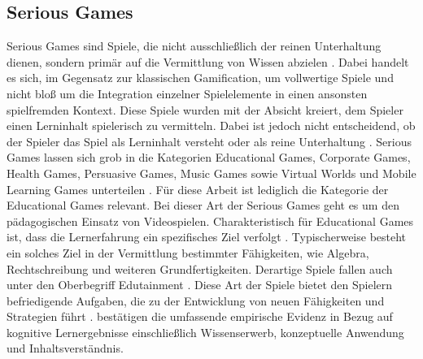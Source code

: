 \subsection{Serious Games}
Serious Games sind Spiele, die nicht ausschließlich der reinen Unterhaltung dienen, sondern primär auf die Vermittlung von Wissen abzielen \cite[S.17]{michael_serious_2005}. Dabei handelt es sich, im Gegensatz zur klassischen Gamification, um vollwertige Spiele und nicht bloß um die Integration einzelner Spielelemente in einen ansonsten spielfremden Kontext. Diese Spiele wurden mit der Absicht kreiert, dem Spieler einen Lerninhalt spielerisch zu vermitteln.
Dabei ist jedoch nicht entscheidend, ob der Spieler das Spiel als Lerninhalt versteht oder als reine Unterhaltung \cite[S.3]{bopp_serious_2009}.
Serious Games lassen sich grob in die Kategorien Educational  Games, 
Corporate  Games,  Health  Games,  Persuasive  Games,  Music  Games  sowie  Virtual  Worlds  und 
Mobile Learning Games unterteilen \cite[S.4]{bopp_serious_2009}.
Für diese Arbeit ist lediglich die Kategorie der Educational  Games relevant.
Bei dieser Art der Serious Games geht es um den pädagogischen Einsatz von Videospielen.
Charakteristisch für Educational  Games ist, dass die Lernerfahrung ein spezifisches Ziel verfolgt \cite{nielsen_overview_2006, bopp_serious_2009}.
Typischerweise besteht ein solches Ziel in der Vermittlung bestimmter Fähigkeiten, wie Algebra, Rechtschreibung und weiteren Grundfertigkeiten.
Derartige Spiele fallen auch unter den Oberbegriff Edutainment \cite{nielsen_overview_2006}.
Diese Art der Spiele bietet den Spielern befriedigende Aufgaben, die zu der Entwicklung von neuen Fähigkeiten und Strategien führt \cite{stapleton_serious_2004}.
\citeauthor{vlachopoulos_effect_2017} bestätigen die umfassende empirische Evidenz in Bezug auf kognitive Lernergebnisse einschließlich Wissenserwerb, konzeptuelle Anwendung und Inhaltsverständnis.

